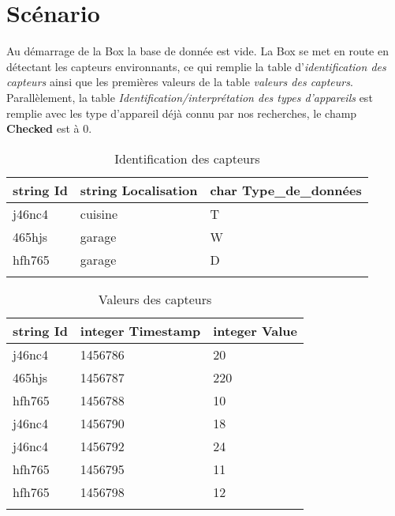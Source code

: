 \documentclass[10pt,a4paper]{article}
\begin{document}
\section{Scénario}
Au démarrage de la Box la base de donnée est vide. La Box se met en route en détectant les capteurs environnants, ce qui remplie la table d'\textit{identification des capteurs} ainsi que les premières valeurs de la table\textit{ valeurs des capteurs}. Parallèlement, la table \textit{Identification/interprétation des types d'appareils} est remplie avec les type d'appareil déjà connu par nos recherches, le champ \textbf{Checked} est à 0. \\
\begin{table}[h!]
    \centering
    \begin{tabular}{|l|l|l|}
    \hline
    \rowcolor[HTML]{EFEFEF} 
    string Id & string Localisation & char Type\_de\_données \\ \hline
    j46nc4    & cuisine             & T                      \\ \hline
    465hjs    & garage              & W                      \\ \hline
    hfh765    & garage              & D                      \\ \hline
              &                     &                       
    \end{tabular}
    \caption{Identification des capteurs}
\end{table}

\begin{table}[h!]
\centering
    \begin{tabular}{|l|l|l|}
    \hline
    \rowcolor[HTML]{EFEFEF} 
    string Id & integer Timestamp & integer Value \\ \hline
    j46nc4    & 1456786           & 20            \\ \hline
    465hjs    & 1456787           & 220           \\ \hline
    hfh765    & 1456788           & 10            \\ \hline
    j46nc4    & 1456790           & 18            \\ \hline
    j46nc4    & 1456792           & 24            \\ \hline
    hfh765    & 1456795           & 11            \\ \hline
    hfh765    & 1456798           & 12            \\ \hline
              &                   &              
    \end{tabular}
    \caption{Valeurs des capteurs}
\end{table}
\end{document}
